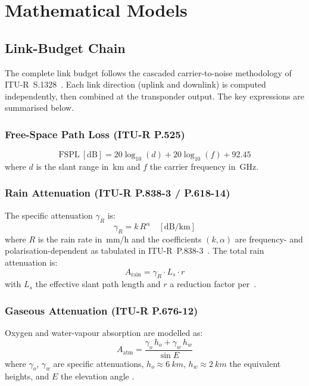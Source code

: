 \documentclass[telecom,article,submit,pdftex,moreauthors]{Definitions/mdpi}
\begin{document}
\section{Mathematical Models}
\label{sec:models}

\subsection{Link-Budget Chain}

The complete link budget follows the cascaded carrier-to-noise methodology
of ITU-R~S.1328~\cite{itu_s1328}.  Each link direction (uplink and
downlink) is computed independently, then combined at the transponder
output.  The key expressions are summarised below.

\subsubsection{Free-Space Path Loss (ITU-R P.525)}
\begin{equation}
  \text{FSPL}~[\text{dB}] = 20\log_{10}(d) + 20\log_{10}(f) + 92.45
  \label{eq:fspl}
\end{equation}
where $d$ is the slant range in~km and $f$ the carrier frequency in~GHz.

\subsubsection{Rain Attenuation (ITU-R P.838-3 / P.618-14)}
The specific attenuation $\gamma_R$ is:
\begin{equation}
  \gamma_R = k\,R^{\alpha} \quad [\text{dB/km}]
  \label{eq:rain_specific}
\end{equation}
where $R$ is the rain rate in~mm/h and the coefficients $(k,\alpha)$ are
frequency- and polarisation-dependent as tabulated in
ITU-R~P.838-3~\cite{itu_p838}.  The total rain attenuation is:
\begin{equation}
  A_{\text{rain}} = \gamma_R \cdot L_s \cdot r
  \label{eq:rain_total}
\end{equation}
with $L_s$ the effective slant path length and $r$ a reduction factor
per~\cite{itu_p618}.

\subsubsection{Gaseous Attenuation (ITU-R P.676-12)}
Oxygen and water-vapour absorption are modelled as:
\begin{equation}
  A_{\text{atm}} = \frac{\gamma_o\,h_o + \gamma_w\,h_w}{\sin E}
  \label{eq:gas}
\end{equation}
where $\gamma_o$, $\gamma_w$ are specific attenuations, $h_o \approx
\SI{6}{km}$, $h_w \approx \SI{2}{km}$ the equivalent heights, and $E$
the elevation angle \cite{itu_p676}.
\end{document}
